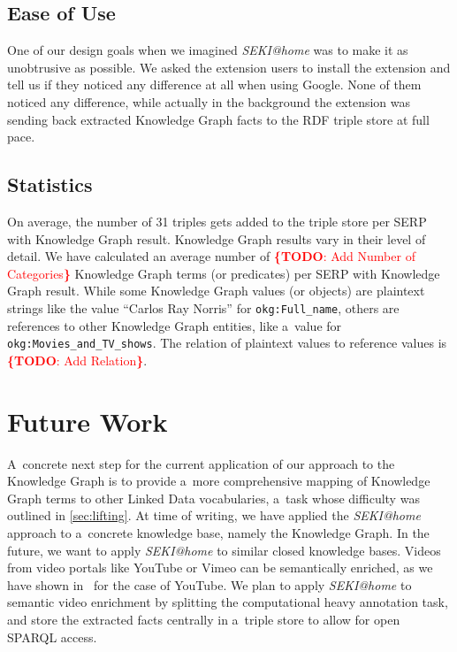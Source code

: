 \documentclass[runningheads,a4paper]{llncs}
\newcommand{\todo}[1]{\noindent\textcolor{red}{{\bf \{TODO}: #1{\bf \}}}}
\begin{document}
\subsection{Ease of Use}
One of our design goals when we imagined \emph{SEKI@home}
was to make it as unobtrusive as possible.
We asked the extension users to install the extension
and tell us if they noticed any difference at all when using Google.
None of them noticed any difference,
while actually in the background the extension
was sending back extracted Knowledge Graph facts
to the RDF triple store at full pace.

\subsection{Statistics}
On average, the number of 31 triples gets added to the triple store
per SERP with Knowledge Graph result.
Knowledge Graph results vary in their level of detail.
We have calculated an average number of \todo{Add Number of Categories}
Knowledge Graph terms (or predicates) per SERP with Knowledge Graph result.
While some Knowledge Graph values (or objects) are plaintext strings
like the value ``Carlos Ray Norris'' for \texttt{okg:Full\_name},
others are references to other Knowledge Graph entities,
like a~value for \texttt{okg:Movies\_and\_TV\_shows}.
The relation of plaintext values to reference values is \todo{Add Relation}.

\section{Future Work} \label{sec:future-work}
A~concrete next step for the current application
of our approach to the Knowledge Graph is
to provide a~more comprehensive mapping
of Knowledge Graph terms to other Linked Data vocabularies,
a~task whose difficulty was outlined in \autoref{sec:lifting}.
At time of writing, we have applied the \emph{SEKI@home} approach
to a~concrete knowledge base, namely the Knowledge Graph.
In the future, we want to apply \emph{SEKI@home} to
similar closed knowledge bases.
Videos from video portals like YouTube or Vimeo can be semantically enriched,
as we have shown in~\cite{steiner2010} for the case of YouTube.
We plan to apply \emph{SEKI@home} to semantic video enrichment by splitting
the computational heavy annotation task,
and store the extracted facts centrally in a~triple store
to allow for open SPARQL access.
\end{document}

